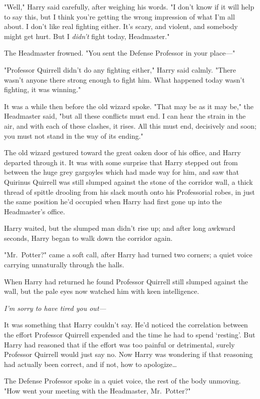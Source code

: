 "Well," Harry said carefully, after weighing his words. "I don't know if it 
will help to say this, but I think you're getting the wrong impression of what 
I'm all about. I don't like real fighting either. It's scary, and violent, and 
somebody might get hurt. But I \emph{didn't} fight today, Headmaster."

The Headmaster frowned. "You sent the Defense Professor in your place---"

"Professor Quirrell didn't do any fighting either," Harry said calmly. "There 
wasn't anyone there strong enough to fight him. What happened today wasn't 
fighting, it was winning."

It was a while then before the old wizard spoke. "That may be as it may be," 
the Headmaster said, "but all these conflicts must end. I can hear the strain 
in the air, and with each of these clashes, it rises. All this must end, 
decisively and soon; you must not stand in the way of its ending."

The old wizard gestured toward the great oaken door of his office, and Harry 
departed through it.
\sbreak
It was with some surprise that Harry stepped out from between the huge grey 
gargoyles which had made way for him, and saw that Quirinus Quirrell was still 
slumped against the stone of the corridor wall, a thick thread of spittle 
drooling from his slack mouth onto his Professorial robes, in just the same 
position he'd occupied when Harry had first gone up into the Headmaster's 
office.

Harry waited, but the slumped man didn't rise up; and after long awkward 
seconds, Harry began to walk down the corridor again.

"Mr.~Potter?" came a soft call, after Harry had turned two corners; a quiet 
voice carrying unnaturally through the halls.

When Harry had returned he found Professor Quirrell still slumped against the 
wall, but the pale eyes now watched him with keen intelligence.

\emph{I'm sorry to have tired you out---}

It was something that Harry couldn't say. He'd noticed the correlation between 
the effort Professor Quirrell expended and the time he had to spend `resting'. 
But Harry had reasoned that if the effort was too painful or detrimental, 
surely Professor Quirrell would just say no. Now Harry was wondering if that 
reasoning had actually been correct, and if not, how to apologize{\ldots}

The Defense Professor spoke in a quiet voice, the rest of the body unmoving. 
"How went your meeting with the Headmaster, Mr.~Potter?"

